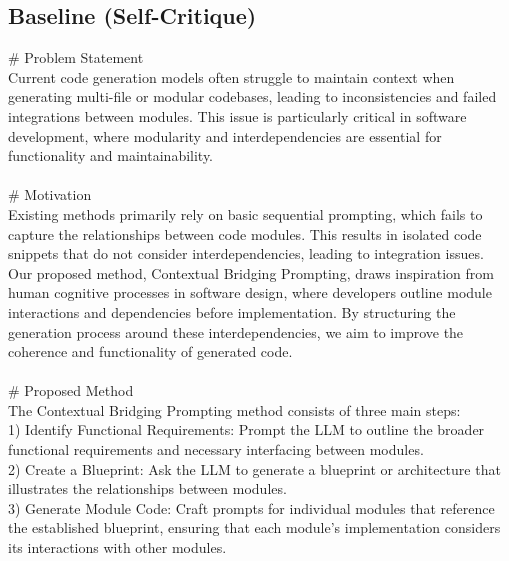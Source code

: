 \subsection{Baseline (Self-Critique)}
{\centering
\begin{tcolorbox}[
    colframe=green!50!black, 
    colback=green!10!white, 
    title=Contextual Bridging Prompting: Enhancing Code Generation in Modular Codebases with Large Language Models, 
    width=0.95\textwidth,
    boxsep=3pt
]
\# Problem Statement \\
Current code generation models often struggle to maintain context when generating multi-file or modular codebases, leading to inconsistencies and failed integrations between modules. This issue is particularly critical in software development, where modularity and interdependencies are essential for functionality and maintainability.
\\
\\
\# Motivation \\
Existing methods primarily rely on basic sequential prompting, which fails to capture the relationships between code modules. This results in isolated code snippets that do not consider interdependencies, leading to integration issues. Our proposed method, Contextual Bridging Prompting, draws inspiration from human cognitive processes in software design, where developers outline module interactions and dependencies before implementation. By structuring the generation process around these interdependencies, we aim to improve the coherence and functionality of generated code.
\\
\\
\# Proposed Method \\
The Contextual Bridging Prompting method consists of three main steps: \\
1) Identify Functional Requirements: Prompt the LLM to outline the broader functional requirements and necessary interfacing between modules. \\
2) Create a Blueprint: Ask the LLM to generate a blueprint or architecture that illustrates the relationships between modules. \\
3) Generate Module Code: Craft prompts for individual modules that reference the established blueprint, ensuring that each module's implementation considers its interactions with other modules.
\end{tcolorbox}
\par}
\clearpage

